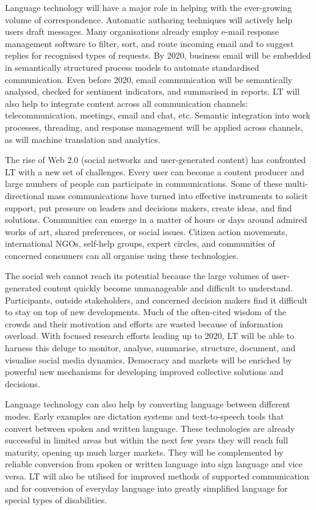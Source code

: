 \documentclass[10pt, plain]{../../metanetpaper}
\begin{document}
\begin{multicols}{2}
Language technology will have a major role in helping with the ever-growing volume of correspondence. Automatic authoring techniques will actively help users draft messages. Many organisations already employ e-mail response management software to filter, sort, and route incoming email and to suggest replies for recognised types of requests. By 2020, business email will be embedded in semantically structured process models to automate standardised communication. Even before 2020, email communication will be semantically analysed, checked for sentiment indicators, and summarised in reports. LT will also help to integrate content across all communication channels: telecommunication, meetings, email and chat, etc. Semantic integration into work processes, threading, and response management will be applied across channels, as will machine translation and analytics.
 
The rise of Web 2.0 (social networks and user-generated content) has confronted LT with a new set of challenges. Every user can become a content producer and large numbers of people can participate in communications. Some of these multi-directional mass communications have turned into effective instruments to solicit support, put pressure on leaders and decisions makers, create ideas, and find solutions. Communities can emerge in a matter of hours or days around admired works of art, shared preferences, or social issues. Citizen action movements, international NGOs, self-help groups, expert circles, and communities of concerned consumers can all organise using these technologies.

The social web cannot reach its potential because the large volumes of user-generated content quickly become unmanageable and difficult to understand. Participants, outside stakeholders, and concerned decision makers find it difficult to stay on top of new developments. Much of the often-cited wisdom of the crowds and their motivation and efforts are wasted because of information overload. With focused research efforts leading up to 2020, LT will be able to harness this deluge to monitor, analyse, summarise, structure, document, and visualise social media dynamics. Democracy and markets will be enriched by powerful new mechanisms for developing improved collective solutions and decisions.

Language technology can also help by converting language between different modes. Early examples are dictation systems and text-to-speech tools that convert between spoken and written language. These technologies are already successful in limited areas but within the next few years they will reach full maturity, opening up much larger markets. They will be complemented by reliable conversion from spoken or written language into sign language and vice versa. LT will also be utilised for improved methods of supported communication and for conversion of everyday language into greatly simplified language for special types of disabilities.


\end{multicols}
\end{document}
